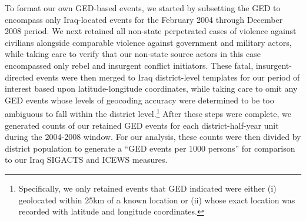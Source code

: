 \documentclass[12pt]{article}
\begin{document}
To format our own GED-based events, we started by subsetting the GED to encompass only Iraq-located events for the February 2004 through December 2008 period. We next retained all non-state perpetrated cases of violence against civilians alongside comparable violence against government and military actors, while taking care to verify that our non-state source actors in this case encompassed only rebel and insurgent conflict initiators. These fatal, insurgent-directed events were then merged to Iraq district-level templates for our period of interest based upon latitude-longitude coordinates, while taking care to omit any GED events whose levels of geocoding accuracy were determined to be too ambiguous to fall within the district level.\footnote{Specifically, we only retained events that GED indicated were either (i) geolocated within 25km of a known location or (ii) whose exact location was recorded with latitude and longitude coordinates.} After these steps were complete, we generated counts of our retained GED events for each district-half-year unit during the 2004-2008 window. For our analysis, these counts were then divided by district population to generate a ``GED events per 1000 persons'' for comparison to our Iraq SIGACTS and ICEWS measures.



\end{document}
